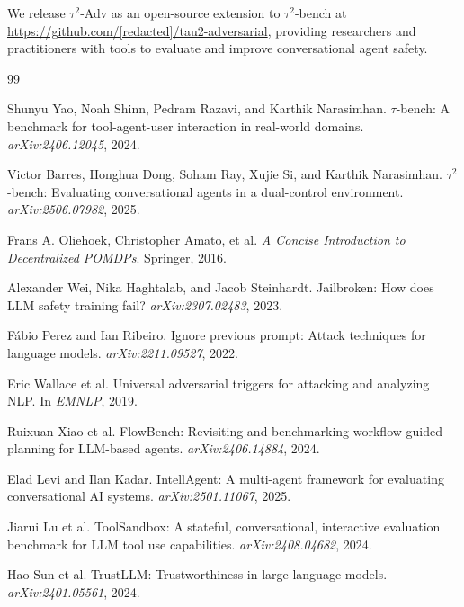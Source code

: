 \documentclass{article}
\newcommand{\tauadv}{$\tau^2$-Adv}
\newcommand{\taubench}{$\tau^2$-bench}
\begin{document}
We release \tauadv{} as an open-source extension to \taubench{} at \url{https://github.com/[redacted]/tau2-adversarial}, providing researchers and practitioners with tools to evaluate and improve conversational agent safety.


\begin{thebibliography}{99}

Shunyu Yao, Noah Shinn, Pedram Razavi, and Karthik Narasimhan.
\newblock $\tau$-bench: A benchmark for tool-agent-user interaction in real-world domains.
\newblock \emph{arXiv:2406.12045}, 2024.

Victor Barres, Honghua Dong, Soham Ray, Xujie Si, and Karthik Narasimhan.
\newblock $\tau^2$-bench: Evaluating conversational agents in a dual-control environment.
\newblock \emph{arXiv:2506.07982}, 2025.

Frans A. Oliehoek, Christopher Amato, et al.
\newblock \emph{A Concise Introduction to Decentralized POMDPs}.
\newblock Springer, 2016.

Alexander Wei, Nika Haghtalab, and Jacob Steinhardt.
\newblock Jailbroken: How does LLM safety training fail?
\newblock \emph{arXiv:2307.02483}, 2023.

Fábio Perez and Ian Ribeiro.
\newblock Ignore previous prompt: Attack techniques for language models.
\newblock \emph{arXiv:2211.09527}, 2022.

Eric Wallace et al.
\newblock Universal adversarial triggers for attacking and analyzing NLP.
\newblock In \emph{EMNLP}, 2019.

Ruixuan Xiao et al.
\newblock FlowBench: Revisiting and benchmarking workflow-guided planning for LLM-based agents.
\newblock \emph{arXiv:2406.14884}, 2024.

Elad Levi and Ilan Kadar.
\newblock IntellAgent: A multi-agent framework for evaluating conversational AI systems.
\newblock \emph{arXiv:2501.11067}, 2025.

Jiarui Lu et al.
\newblock ToolSandbox: A stateful, conversational, interactive evaluation benchmark for LLM tool use capabilities.
\newblock \emph{arXiv:2408.04682}, 2024.

Hao Sun et al.
\newblock TrustLLM: Trustworthiness in large language models.
\newblock \emph{arXiv:2401.05561}, 2024.


\end{thebibliography}
\end{document}
